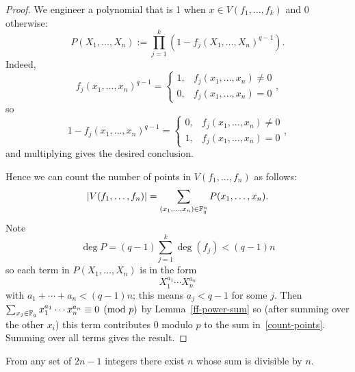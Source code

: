 \begin{proof}
We engineer a polynomial that is 1 when $x\in V(f_1,\ldots, f_k)$ and 0 otherwise:
\[
P(X_1,\ldots, X_n):=\prod_{j=1}^k (1-f_j(X_1,\ldots,X_n)^{q-1}).
\]
Indeed, 
\[
f_j(x_1,\ldots, x_n)^{q-1}=\begin{cases} 
1,&f_j(x_1,\ldots, x_n)\ne 0\\
0,&f_j(x_1,\ldots, x_n)=0
\end{cases},
\]
so
\[
1-f_j(x_1,\ldots, x_n)^{q-1}=\begin{cases} 
0,&f_j(x_1,\ldots, x_n)\ne 0\\
1,&f_j(x_1,\ldots, x_n)=0
\end{cases},
\]
and multiplying gives the desired conclusion.

Hence we can count the number of points in $V(f_1,\ldots, f_n)$ as follows:
\begin{equation}\label{count-points}
|V(f_1,\ldots, f_n)|=
\sum_{(x_1,\ldots, x_n)\in \mathbb{F}_q^n} P(x_1,\ldots, x_n).
\end{equation}
Note
\[
\deg P=(q-1)\sum_{j=1}^k \deg(f_j)<(q-1)n
\]
so each term in $P(X_1,\ldots, X_n)$ is in the form
\[
X_1^{a_1}\cdots X_n^{a_n}
\]
with $a_1+\cdots + a_n<(q-1)n$; this means $a_j<q-1$ for some $j$. Then $\sum_{x_j\in \mathbb{F}_q} x_1^{a_1}\cdots x_n^{a_n}\equiv 0\pmod{p}$ by Lemma~\ref{ff-power-sum} so (after summing over the other $x_i$) this term contributes 0 modulo $p$ to the sum in~\ref{count-points}. Summing over all terms gives the result.
\end{proof}
\begin{thm}\label{erdos-ginzburg-ziv}
From any set of $2n-1$ integers there exist $n$ whose sum is divisible by $n$.
\end{thm}
